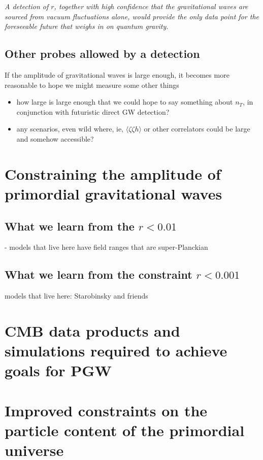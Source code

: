 {\it A detection of $r$, together with high confidence that the gravitational waves are sourced from vacuum fluctuations alone, would provide the only data point for the foreseeable future that weighs in on quantum gravity.}

\subsection{Other probes allowed by a detection}
If the amplitude of gravitational waves is large enough, it becomes more reasonable to hope we might measure some other things
 \begin{itemize}
\item how large is large enough that we could hope to say something about $n_T$, in conjunction with futuristic direct GW detection?
\item any scenarios, even wild where, ie, $\langle\zeta\zeta h\rangle$ or other correlators could be large and somehow accessible?
 \end{itemize}

\section{Constraining the amplitude of primordial gravitational waves} 
\label{sec:upperLimits}
\subsection{What we learn from the $r<0.01$}
- models that live here have field ranges that are super-Planckian



\subsection{What we learn from the constraint $r<0.001$}

models that live here: Starobinsky and friends

\section{CMB data products and simulations required to achieve goals for PGW}
\label{sec:needs}

\section{Improved constraints on the particle content of the primordial universe}
\label{sec:scalar}

